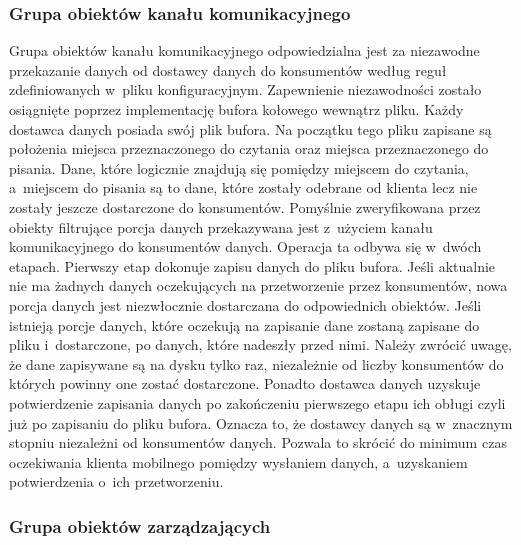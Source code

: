\subsubsection[Grupa obiektów kanału komunikacyjnego][Grupa obiektów
kanału komunikacyjnego]{Grupa obiektów kanału komunikacyjnego}

Grupa obiektów kanału komunikacyjnego odpowiedzialna jest za
niezawodne przekazanie danych od dostawcy danych do konsumentów według
reguł zdefiniowanych w~pliku konfiguracyjnym. Zapewnienie
niezawodności zostało osiągnięte poprzez implementację bufora kołowego
wewnątrz pliku. Każdy dostawca danych posiada swój plik bufora. Na
początku tego pliku zapisane są położenia miejsca przeznaczonego do
czytania oraz miejsca przeznaczonego do pisania. Dane, które logicznie
znajdują się pomiędzy miejscem do czytania, a~miejscem do pisania są
to dane, które zostały odebrane od klienta lecz nie zostały jeszcze
dostarczone do konsumentów. Pomyślnie zweryfikowana przez obiekty
filtrujące porcja danych przekazywana jest z~użyciem kanału
komunikacyjnego do konsumentów danych. Operacja ta odbywa się w~dwóch
etapach. Pierwszy etap dokonuje zapisu danych do pliku bufora. Jeśli
aktualnie nie ma żadnych danych oczekujących na przetworzenie przez
konsumentów, nowa porcja danych jest niezwłocznie dostarczana do
odpowiednich obiektów. Jeśli istnieją porcje danych, które oczekują na
zapisanie dane zostaną zapisane do pliku i~dostarczone, po danych,
które nadeszły przed nimi. Należy zwrócić uwagę, że dane zapisywane są
na dysku tylko raz, niezależnie od liczby konsumentów do których
powinny one zostać dostarczone. Ponadto dostawca danych uzyskuje
potwierdzenie zapisania danych po zakończeniu pierwszego etapu ich
obługi czyli już po zapisaniu do pliku bufora. Oznacza to, że dostawcy
danych są w~znacznym stopniu niezależni od konsumentów danych. Pozwala
to skrócić do minimum czas oczekiwania klienta mobilnego pomiędzy
wysłaniem danych, a~uzyskaniem potwierdzenia o~ich przetworzeniu.

\subsubsection[Grupa obiektów zarządzających][Grupa obiektów
zarządzających]{Grupa obiektów zarządzających}


